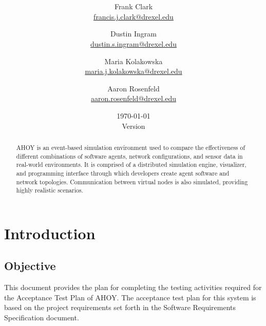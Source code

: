 \documentclass[titlepage]{article}
\title{\textbf{\mytitle}}
\author{
    Frank Clark \\\url{francis.j.clark@drexel.edu}
    \and Dustin Ingram \\\url{dustin.s.ingram@drexel.edu}
    \and Maria Kolakowska \\\url{maria.j.kolakowska@drexel.edu}
    \and Aaron Rosenfeld \\\url{aaron.rosenfeld@drexel.edu}
}
\date{\today\\Version \version}
\begin{document}

\begin{figure}
    \centering
    \scalebox{0.8}{}
    \vspace{-4em}
\end{figure}

\maketitle

\begin{abstract}
AHOY is an event-based simulation environment used to compare the effectiveness of different combinations of software agents, network configurations, and sensor data in real-world environments.  It is comprised of a distributed simulation engine, visualizer, and programming interface through which developers create agent software and network topologies.  Communication between virtual nodes is also simulated, providing highly realistic scenarios.
\end{abstract}

\setcounter{tocdepth}{4}
\tableofcontents
\pagebreak
{}



\section{Introduction%
  \label{introduction}%
}


\subsection{Objective%
  \label{objective}%
}
    This document provides the plan for completing the testing activities required for the Acceptance Test Plan of AHOY. The acceptance test plan for this system is based on the project requirements set forth in the Software Requirements Specification document.

\end{document}
